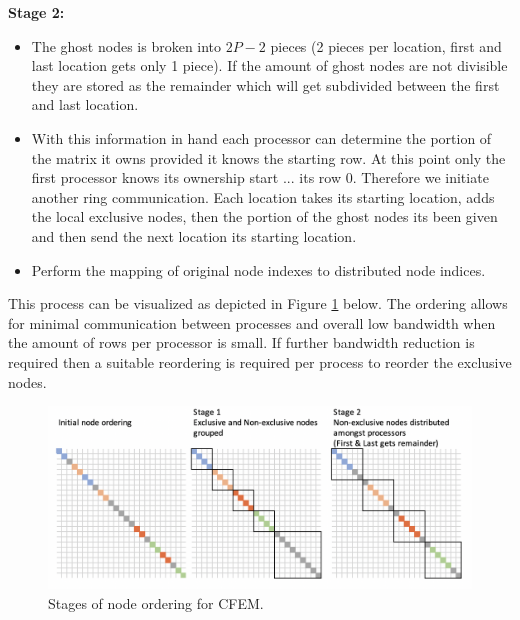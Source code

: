 \documentclass[11pt,letterpaper,titlepage]{article}
\numberwithin{equation}{section}
\begin{document}
\textbf{Stage 2:}
\begin{itemize}
\item The ghost nodes is broken into $2P-2$ pieces (2 pieces per location, first and last location gets only 1 piece). If the amount of ghost nodes are not divisible they are stored as the remainder which will get subdivided between the first and last location.
\item With this information in hand each processor can determine the portion of the matrix it owns provided it knows the starting row. At this point only the first processor knows its ownership start ... its row 0. Therefore we initiate another ring communication. Each location takes its starting location, adds the local exclusive nodes, then the portion of the ghost nodes its been given and then send the next location its starting location.
\item Perform the mapping of original node indexes to distributed node indices.
\end{itemize}

This process can be visualized as depicted in Figure \ref{fig:CFEMReordering} below. The ordering allows for minimal communication between processes and overall low bandwidth when the amount of rows per processor is small. If further bandwidth reduction is required then a suitable reordering is required per process to reorder the exclusive nodes.

\begin{figure}[H]
\centering
\includegraphics[width=0.9\linewidth]{Figures/CFEMReordering}
\caption{Stages of node ordering for CFEM.}
\label{fig:CFEMReordering}
\end{figure}
\end{document}

